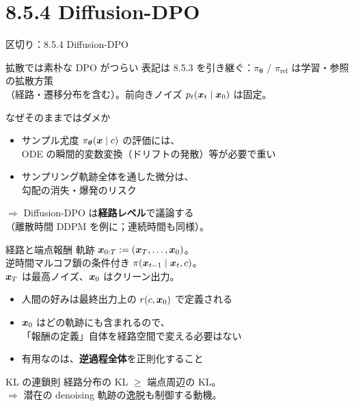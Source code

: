 \section{8.5.4 Diffusion-DPO}
\asmain
\begin{frame}{区切り：8.5.4 Diffusion-DPO}
    \tableofcontents[currentsection]
\end{frame}
\asmain
\begin{frame}{拡散では素朴な DPO がつらい}
    表記は 8.5.3 を引き継ぐ：$\pi_{\bm{\theta}}$ / $\pi_{\mathrm{ref}}$ は学習・参照の拡散方策\\
    （経路・遷移分布を含む）。前向きノイズ $p_t(\bm{x}_t\mid\bm{x}_0)$ は固定。
    \begin{alertblock}{なぜそのままではダメか}
        \begin{itemize}
            \item サンプル尤度 $\pi_{\bm{\theta}}(\bm{x}\mid c)$ の評価には、\\
            ODE の瞬間的変数変換（ドリフトの発散）等が必要で重い
            \item サンプリング軌跡全体を通した微分は、\\
            勾配の消失・爆発のリスク
        \end{itemize}
    \end{alertblock}
    $\Rightarrow$ Diffusion-DPO は\textbf{経路レベル}で議論する\\
    （離散時間 DDPM を例に；連続時間も同様）。
\end{frame}
\asmain
\begin{frame}{経路と端点報酬}
    軌跡 $\bm{x}_{0:T}:=(\bm{x}_T,\ldots,\bm{x}_0)$。\\
    逆時間マルコフ鎖の条件付き $\pi(\bm{x}_{t-1}\mid\bm{x}_t,c)$。\\
    $\bm{x}_T$ は最高ノイズ、$\bm{x}_0$ はクリーン出力。
    \begin{itemize}
        \item 人間の好みは最終出力上の $r(c,\bm{x}_0)$ で定義される
        \item $\bm{x}_0$ はどの軌跡にも含まれるので、\\
        「報酬の定義」自体を経路空間で変える必要はない
        \item 有用なのは、\textbf{逆過程全体}を正則化すること
    \end{itemize}
    \begin{exampleblock}{KL の連鎖則}
        経路分布の KL $\ge$ 端点周辺の KL。\\
        $\Rightarrow$ 潜在の denoising 軌跡の逸脱も制御する動機。
    \end{exampleblock}
\end{frame}
